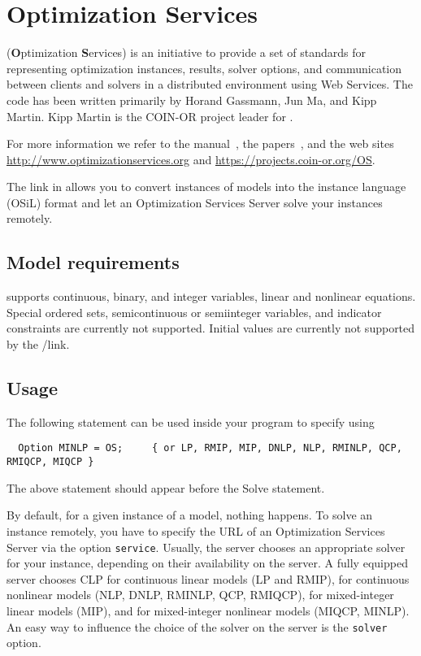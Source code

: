 

\section{Optimization Services}

\OS (\textbf{O}ptimization \textbf{S}ervices) is an initiative to provide a set of standards for representing optimization instances, results, solver options, and communication between clients and solvers in a distributed environment using Web Services.
The code has been written primarily by Horand Gassmann, Jun Ma, and Kipp Martin.
Kipp Martin is the COIN-OR project leader for \OS.

For more information we refer to the \OS manual~\cite{Ma2005}, the papers~\cite{FourerMaMartin2009,FourerMaMartin2010,OSManual}, and the web sites \url{http://www.optimizationservices.org} and \url{https://projects.coin-or.org/OS}.

The \OS link in \MYGAMS allows you to convert instances of \MYGAMS models into the \OS instance language (OSiL) format and let an Optimization Services Server solve your instances remotely.

\subsection{Model requirements}

\OS supports continuous, binary, and integer variables, linear and nonlinear equations.
Special ordered sets, semicontinuous or semiinteger variables, and indicator constraints are currently not supported.
Initial values are currently not supported by the \MYGAMS/\OS link.

\subsection{Usage}

The following statement can be used inside your \MYGAMS program to specify using \OS
\begin{verbatim}
  Option MINLP = OS;     { or LP, RMIP, MIP, DNLP, NLP, RMINLP, QCP, RMIQCP, MIQCP }
\end{verbatim}

The above statement should appear before the Solve statement.

By default, for a given instance of a \MYGAMS model, nothing happens.
To solve an instance remotely, you have to specify the URL of an Optimization Services Server via the option \texttt{service}.
Usually, the server chooses an appropriate solver for your instance, depending on their availability on the server.
A fully equipped server chooses
\textsc{CLP} for continuous linear models (LP and RMIP),
\IPOPT for continuous nonlinear models (NLP, DNLP, RMINLP, QCP, RMIQCP),
\CBC for mixed-integer linear models (MIP), and
\BONMIN for mixed-integer nonlinear models (MIQCP, MINLP).
An easy way to influence the choice of the solver on the server is the \texttt{solver} option.

